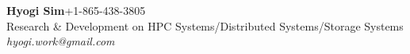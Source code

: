 {\textbf{\Large Hyogi Sim}\hfill{\small +1-865-438-3805}}\\
{\small
{Research \& Development on HPC Systems/Distributed Systems/Storage Systems}
    \hfill{\emph{\small hyogi.work@gmail.com}}\\
}
